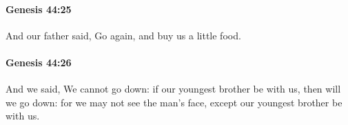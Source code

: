 		\paragraph{Genesis 44:25} %
			\label{GENESIS-44-25}

			And our father said, Go again, and buy us a little food.


		\paragraph{Genesis 44:26} %
			\label{GENESIS-44-26}

			And we said, We cannot go down: if our youngest brother be with us, then will we go down: for we may not see the man's face, except our youngest brother be with us.



